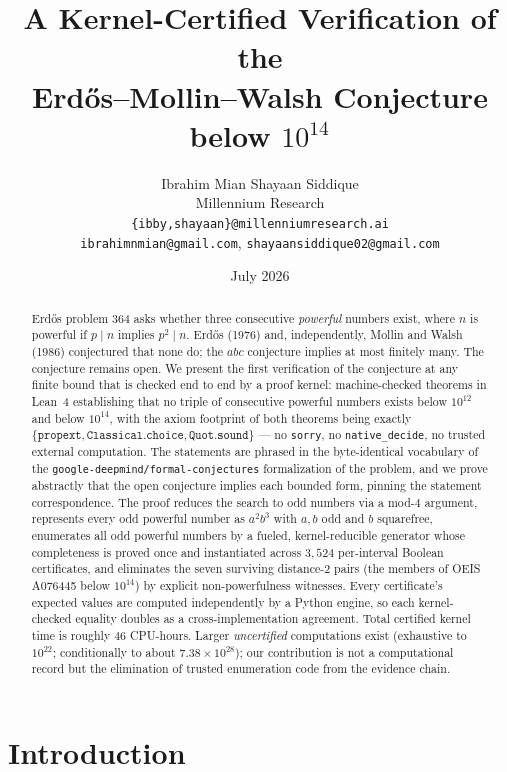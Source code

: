 \documentclass[11pt]{article}
\title{\bfseries A Kernel-Certified Verification of the\\
Erd\H{o}s--Mollin--Walsh Conjecture below $10^{14}$}
\author{Ibrahim Mian \qquad Shayaan Siddique\\[2pt]
  \normalsize Millennium Research\\
  \normalsize\texttt{\{ibby,shayaan\}@millenniumresearch.ai}\\
  \normalsize\texttt{ibrahimnmian@gmail.com}, \texttt{shayaansiddique02@gmail.com}}
\date{July 2026}
\theoremstyle{definition}
\theoremstyle{remark}
\newcommand{\code}[1]{\texttt{#1}}
\begin{document}
\maketitle

\begin{abstract}
Erd\H{o}s problem 364 asks whether three consecutive \emph{powerful}
numbers exist, where $n$ is powerful if $p \mid n$ implies $p^2 \mid n$.
Erd\H{o}s (1976) and, independently, Mollin and Walsh (1986) conjectured
that none do; the $abc$ conjecture implies at most finitely many. The
conjecture remains open. We present the first verification of the
conjecture at any finite bound that is checked end to end by a proof
kernel: machine-checked theorems in Lean~4 establishing that no triple of
consecutive powerful numbers exists below $10^{12}$ and below $10^{14}$,
with the axiom footprint of both theorems being exactly
$\{\code{propext}, \code{Classical.choice}, \code{Quot.sound}\}$ --- no
\code{sorry}, no \code{native\_decide}, no trusted external computation.
The statements are phrased in the byte-identical vocabulary of the
\code{google-deepmind/formal-conjectures} formalization of the problem,
and we prove abstractly that the open conjecture implies each bounded
form, pinning the statement correspondence. The proof reduces the search
to odd numbers via a mod-$4$ argument, represents every odd powerful
number as $a^2 b^3$ with $a,b$ odd and $b$ squarefree, enumerates all odd
powerful numbers by a fueled, kernel-reducible generator whose
completeness is proved once and instantiated across $3{,}524$ per-interval
Boolean certificates, and eliminates the seven surviving distance-$2$
pairs (the members of OEIS A076445 below $10^{14}$) by explicit
non-powerfulness witnesses. Every certificate's expected values are
computed independently by a Python engine, so each kernel-checked equality
doubles as a cross-implementation agreement. Total certified kernel time
is roughly $46$ CPU-hours. Larger \emph{uncertified} computations exist
(exhaustive to $10^{22}$; conditionally to about $7.38 \times 10^{28}$);
our contribution is not a computational record but the elimination of
trusted enumeration code from the evidence chain.
\end{abstract}

\section{Introduction}\label{sec:intro}
\end{document}
